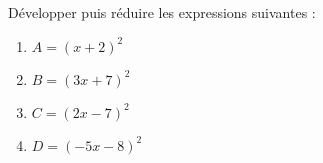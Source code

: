 \begin{minipage}{0.99\linewidth}

\exo

Développer puis réduire les expressions suivantes :


\begin{enumerate}

\item $A = (x+2)^2$

\item $B = (3x+7)^2$

\item $C = (2x-7)^2$

\item $D = (-5x-8)^2$

\end{enumerate}

\end{minipage}

\vspace{0.5cm}
